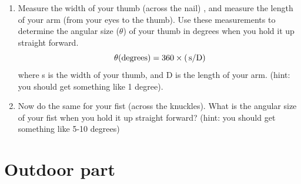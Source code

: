 \documentclass[10pt]{article}%
\begin{document}
\begin{enumerate}

\item Measure the width of your thumb (across the nail) , and measure the length of your arm (from your eyes to the thumb). Use these measurements to determine the angular size ($\theta$) of your thumb in degrees when you hold it up straight forward.
\begin{equation}
{\rm \,\theta (degrees)} = 360\times({\rm \,s/D})
\end{equation}
where s is the width of your thumb, and D is the length of your arm. (hint: you should get something like 1 degree).

\item Now do the same for your fist (across the knuckles). What is the angular size of your fist when you hold it up straight forward? (hint: you should get something like 5-10 degrees)


\end{enumerate}

\section{Outdoor part}
\end{document}
